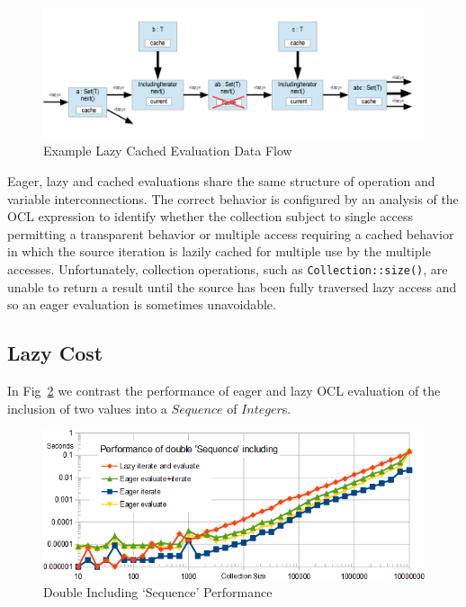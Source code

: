 \documentclass{llncs}
\begin{document}
\begin{figure}
	\begin{center}
		\includegraphics[width=4.5in]{LazyCachedExample.png}
	\end{center}
	\caption{Example Lazy Cached Evaluation Data Flow}
	\label{fig:LazyCachedExample}
\end{figure}

Eager, lazy and cached evaluations share the same structure of operation and variable interconnections. The correct behavior is configured by an analysis of the OCL expression to identify whether the collection subject to single access permitting a transparent behavior or multiple access requiring a cached behavior in which the source iteration is lazily cached for multiple use by the multiple accesses. Unfortunately, collection operations, such as \verb$Collection::size()$, are unable to return a result until the source has been fully traversed  lazy access and so an eager evaluation is sometimes unavoidable.

\subsection{Lazy Cost}

In Fig~\ref{fig:DoubleIncludingPerformance} we contrast the performance of eager and lazy OCL evaluation of the inclusion of two values into a $Sequence$ of $Integer$s. 

\begin{figure}
	\begin{center}
		\includegraphics[width=4.5in]{DoubleIncludingPerformance.png}
	\end{center}
	\caption{Double Including `Sequence' Performance}
	\label{fig:DoubleIncludingPerformance}
\end{figure}
\end{document}
